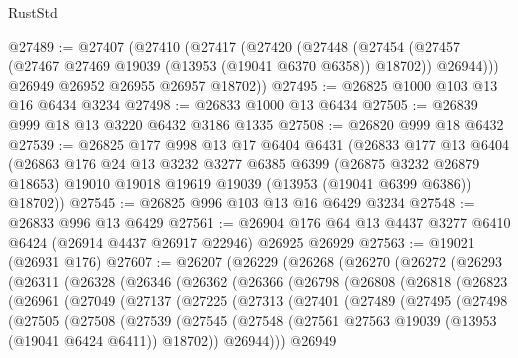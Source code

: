 \begin{lexlean}{RustStd}
\begin{coremodule}
@27489 := @27407
    (@27410
      (@27417
        (@27420
          (@27448
            (@27454 (@27457 (@27467 @27469 @19039 (@13953 (@19041 @6370 @6358)) @18702)) @26944)))
        @26949
        @26952
        @26955
        @26957
        @18702))
@27495 := @26825 @1000 @103 @13 @16 @6434 @3234
@27498 := @26833 @1000 @13 @6434
@27505 := @26839 @999 @18 @13 @3220 @6432 @3186 @1335
@27508 := @26820 @999 @18 @6432
@27539 := @26825
    @177
    @998
    @13
    @17
    @6404
    @6431
    (@26833
      @177
      @13
      @6404
      (@26863
        @176
        @24
        @13
        @3232
        @3277
        @6385
        @6399
        (@26875 @3232 @26879 @18653)
        @19010
        @19018
        @19619
        @19039
        (@13953 (@19041 @6399 @6386))
        @18702))
@27545 := @26825 @996 @103 @13 @16 @6429 @3234
@27548 := @26833 @996 @13 @6429
@27561 := @26904 @176 @64 @13 @4437 @3277 @6410 @6424 (@26914 @4437 @26917 @22946) @26925 @26929
@27563 := @19021 (@26931 @176)
@27607 := @26207
    (@26229
      (@26268
        (@26270
          (@26272
            (@26293
              (@26311
                (@26328
                  (@26346
                    (@26362
                      (@26366
                        (@26798
                          (@26808
                            (@26818
                              (@26823
                                (@26961
                                  (@27049
                                    (@27137
                                      (@27225
                                        (@27313
                                          (@27401
                                            (@27489
                                              (@27495
                                                (@27498
                                                  (@27505
                                                    (@27508
                                                      (@27539
                                                        (@27545
                                                          (@27548
                                                            (@27561
                                                              @27563
                                                              @19039
                                                              (@13953 (@19041 @6424 @6411))
                                                              @18702))
                                                          @26944)))
                                                    @26949

\end{coremodule}
\end{lexlean}
